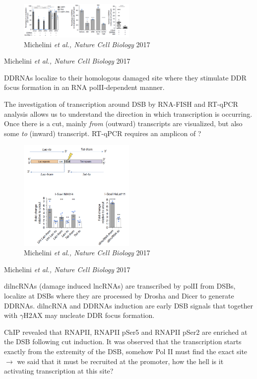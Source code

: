 \begin{figure}
\centering
\includegraphics[width=0.5\textwidth]{Screen_Shot_2022-12-07_at_09-15-58.png}
\caption{Michelini \emph{et al., Nature Cell Biology} 2017}
\end{figure}

Michelini \emph{et al., Nature Cell Biology} 2017

DDRNAs localize to their homologous damaged site where they stimulate DDR focus formation in an RNA polII-dependent manner.

The investigation of transcription around DSB by RNA-FISH and RT-qPCR analysis allows us to understand the direction in which transcription is occurring. Once there is a cut, mainly \emph{from} (outward) transcripts are visualized, but also some \emph{to} (inward) transcript. RT-qPCR requires an amplicon of ?

\begin{figure}
\centering
\includegraphics[width=0.5\textwidth]{Screen_Shot_2022-12-07_at_09-23-19.png}
\caption{Michelini \emph{et al., Nature Cell Biology} 2017}
\end{figure}

Michelini \emph{et al., Nature Cell Biology} 2017

dilncRNAs (damage induced lncRNAs) are transcribed by polII from DSBs, localize at DSBs where they are processed by Drosha and Dicer to generate DDRNAs. dilncRNA and DDRNAs induction are early DSB signals that together with \(\gamma\)H2AX may nucleate DDR focus formation.

ChIP revealed that RNAPII, RNAPII pSer5 and RNAPII pSer2 are enriched at the DSB following cut induction. It was observed that the transcription starts exactly from the extremity of the DSB, somehow Pol II must find the exact site $\rightarrow$ we said that it must be recruited at the promoter, how the hell is it activating transcription at this site?

